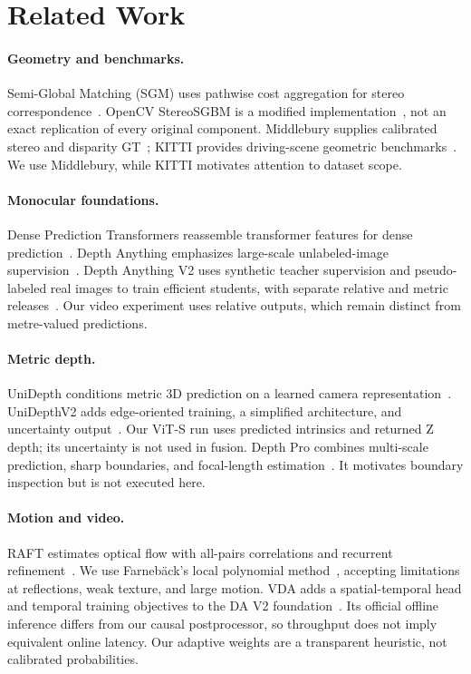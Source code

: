 \section{Related Work}
\paragraph{Geometry and benchmarks.}
Semi-Global Matching (SGM) uses pathwise cost aggregation for stereo correspondence~\cite{sgm}. OpenCV StereoSGBM is a modified implementation~\cite{opencv}, not an exact replication of every original component. Middlebury supplies calibrated stereo and disparity GT~\cite{middlebury}; KITTI provides driving-scene geometric benchmarks~\cite{kitti}. We use Middlebury, while KITTI motivates attention to dataset scope.

\paragraph{Monocular foundations.}
Dense Prediction Transformers reassemble transformer features for dense prediction~\cite{dpt}. Depth Anything emphasizes large-scale unlabeled-image supervision~\cite{dav1}. Depth Anything V2 uses synthetic teacher supervision and pseudo-labeled real images to train efficient students, with separate relative and metric releases~\cite{dav2}. Our video experiment uses relative outputs, which remain distinct from metre-valued predictions.

\paragraph{Metric depth.}
UniDepth conditions metric 3D prediction on a learned camera representation~\cite{unidepth}. UniDepthV2 adds edge-oriented training, a simplified architecture, and uncertainty output~\cite{unidepthv2}. Our ViT-S run uses predicted intrinsics and returned Z depth; its uncertainty is not used in fusion. Depth Pro combines multi-scale prediction, sharp boundaries, and focal-length estimation~\cite{depthpro}. It motivates boundary inspection but is not executed here.

\paragraph{Motion and video.}
RAFT estimates optical flow with all-pairs correlations and recurrent refinement~\cite{raft}. We use Farneb\"ack's local polynomial method~\cite{farneback}, accepting limitations at reflections, weak texture, and large motion. VDA adds a spatial-temporal head and temporal training objectives to the DA V2 foundation~\cite{vda}. Its official offline inference differs from our causal postprocessor, so throughput does not imply equivalent online latency. Our adaptive weights are a transparent heuristic, not calibrated probabilities.
